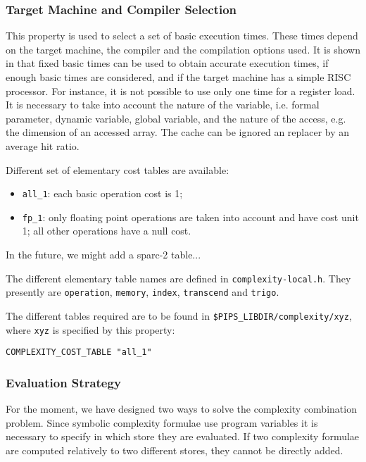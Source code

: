 \subsubsection{Target Machine and Compiler Selection}

This property is used to select a set of basic execution times. These
times depend on the target machine, the compiler and the compilation
options used. It is shown in \cite{Z94} that fixed basic times can be
used to obtain accurate execution times, if enough basic times are
considered, and if the target machine has a simple RISC processor. For
instance, it is not possible to use only one time for a register
load. It is necessary to take into account the nature of the variable,
i.e. formal parameter, dynamic variable, global variable, and the nature
of the access, e.g. the dimension of an accessed array. The cache can be
ignored an replacer by an average hit ratio.

Different set of elementary cost tables are available:

\begin{itemize}

  \item \verb+all_1+: each basic operation cost is 1;

  \item \verb+fp_1+: only floating point operations are taken into
account and have cost unit 1; all other operations have a null cost.

\end{itemize}

In the future, we might add a sparc-2 table...

The different elementary table names are defined in
\verb+complexity-local.h+. They presently are \verb+operation+, 
\verb+memory+, \verb+index+, \verb+transcend+
and \verb+trigo+.

The different tables required are to be found in
\verb+$PIPS_LIBDIR/complexity/xyz+,
where \verb+xyz+ is specified by this property:

\begin{verbatim}
COMPLEXITY_COST_TABLE "all_1"
\end{verbatim}

\subsubsection{Evaluation Strategy}

For the moment, we have designed two ways to solve the complexity
combination problem. Since symbolic complexity formulae use program
variables it is necessary to specify in which store they are
evaluated. If two complexity formulae are computed relatively to two
different stores, they cannot be directly added.

